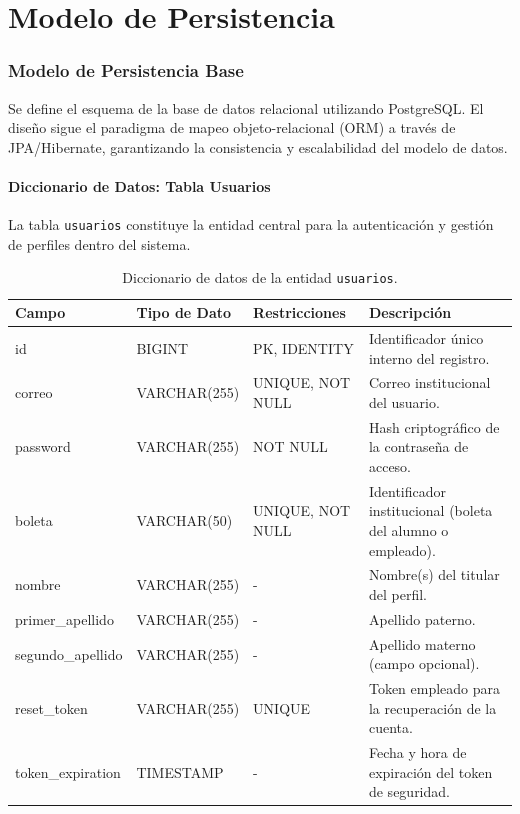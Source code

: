 \chapter{Modelo de Persistencia}
\label{cap:diseno}

\subsection{Modelo de Persistencia Base}
Se define el esquema de la base de datos relacional utilizando PostgreSQL. El diseño sigue el paradigma de mapeo objeto-relacional (ORM) a trav\'es de JPA/Hibernate, garantizando la consistencia y escalabilidad del modelo de datos.

\subsubsection{Diccionario de Datos: Tabla Usuarios}
La tabla \texttt{usuarios} constituye la entidad central para la autenticaci\'on y gesti\'on de perfiles dentro del sistema.

\begin{table}[H]
\centering
\small
\begin{tabularx}{\textwidth}{|l|l|l|X|}
\hline
\rowcolor{azulESCOM} 
\color{white}\textbf{Campo} & \color{white}\textbf{Tipo de Dato} & \color{white}\textbf{Restricciones} & \color{white}\textbf{Descripci\'on} \\ \hline
id & BIGINT & PK, IDENTITY & Identificador \'unico interno del registro. \\ \hline
correo & VARCHAR(255) & UNIQUE, NOT NULL & Correo institucional del usuario. \\ \hline
password & VARCHAR(255) & NOT NULL & Hash criptogr\'afico de la contrase\~na de acceso. \\ \hline
boleta & VARCHAR(50) & UNIQUE, NOT NULL & Identificador institucional (boleta del alumno o empleado). \\ \hline
nombre & VARCHAR(255) & - & Nombre(s) del titular del perfil. \\ \hline
primer\_apellido & VARCHAR(255) & - & Apellido paterno. \\ \hline
segundo\_apellido & VARCHAR(255) & - & Apellido materno (campo opcional). \\ \hline
reset\_token & VARCHAR(255) & UNIQUE & Token empleado para la recuperaci\'on de la cuenta. \\ \hline
token\_expiration & TIMESTAMP & - & Fecha y hora de expiraci\'on del token de seguridad. \\ \hline
\end{tabularx}
\caption{Diccionario de datos de la entidad \texttt{usuarios}.}
\label{tab:dict_usuarios}
\end{table}

